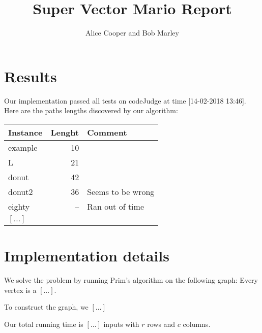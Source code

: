 \documentclass{tufte-handout}
\title{Super Vector Mario Report}
\author{Alice Cooper and Bob Marley}
\begin{document}
  \maketitle

  \section{Results}

  Our implementation passed all tests on codeJudge at time [14-02-2018 13:46].
  Here are the paths lengths discovered by our algorithm:

\bigskip
  \begin{tabular}{lrl}\toprule
    Instance & Lenght & Comment  \\\midrule
    example & 10 &  \\
    L & 21 & \\
    donut & 42 \\
    donut2 & 36 & Seems to be wrong\\
    eighty & -- & Ran out of time\\
    $[\ldots]$ \\\bottomrule
  \end{tabular}
\bigskip


  \section{Implementation details}

  We solve the problem by running Prim's algorithm
  on the following graph:
  Every vertex is a $[\ldots]$.

  To construct the graph, we $[\ldots]$

  Our total running time is $[\ldots]$ inputs with $r$ rows and $c$ columns.
\end{document}
